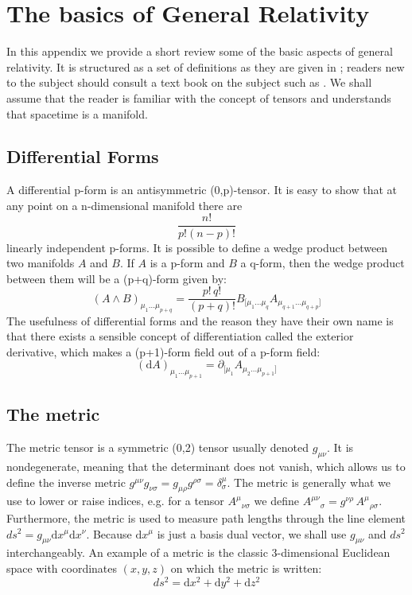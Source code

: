 %
\section{The basics of General Relativity}

In this appendix we provide a short review some of the basic aspects of general relativity. It is structured as a set of definitions as they are given in \cite{GR}; readers new to the subject should consult a text book on the subject such as \cite{GR}. We shall assume that the reader is familiar with the concept of tensors and understands that spacetime is a manifold.


\subsection{Differential Forms}
\thispagestyle{empty}
A differential p-form is an antisymmetric (0,p)-tensor. It is easy to show that at any point on a n-dimensional manifold there are
\begin{equation}
\frac{n!}{p! (n-p)!}
\end{equation}
linearly independent p-forms. It is possible to define a wedge product between two manifolds $A$ and $B$. If $A$ is a p-form and $B$ a q-form, then the wedge product between them will be a (p+q)-form given by:
\begin{equation}
(A \wedge B)_{\mu_1 ... \mu_{p + q}} = \frac{p! \, q!}{(p + q)!} B_{[\mu_1 ... \mu_q} A_{\mu_{q + 1} ... \mu_{q + p}]} 
\end{equation}
The usefulness of differential forms and the reason they have their own name is that there exists a sensible concept of differentiation called the exterior derivative, which makes a (p+1)-form field out of a p-form field:
\begin{equation}
(\mathrm{d}A)_{\mu_1 ... \mu_{p+1}} = \partial_{[\mu_1} A_{\mu_2 ... \mu_{p + 1}]}
\end{equation}


\subsection{The metric}
\thispagestyle{empty}
The metric tensor is a symmetric (0,2) tensor usually denoted $g_{\mu \nu}$. It is nondegenerate, meaning that the determinant does not vanish, which allows us to define the inverse metric $g^{\mu \nu} g_{\nu \sigma} = g_{\mu \rho} g^{\rho \sigma} = \delta_\sigma^\mu$. The metric is generally what we use to lower or raise indices, e.g. for a tensor ${A^{\mu}}_{\nu \sigma}$ we define ${A^{\mu \nu}}_{\sigma} = g^{\nu \rho} \, {A^\mu}_{\rho \sigma}$. Furthermore, the metric is used to measure path lengths through the line element $ds^2 = g_{\mu \nu} \mathrm{d}x^\mu \mathrm{d}x^\nu$. Because $\mathrm{d}x^\mu$ is just a basis dual vector, we shall use $g_{\mu \nu}$ and $ds^2$ interchangeably. An example of a metric is the classic 3-dimensional Euclidean space with coordinates $(x,y,z)$ on which the metric is written:
\begin{equation}
ds^2 = \mathrm{d}x^2 + \mathrm{d}y^2 + \mathrm{d}z^2
\end{equation}


